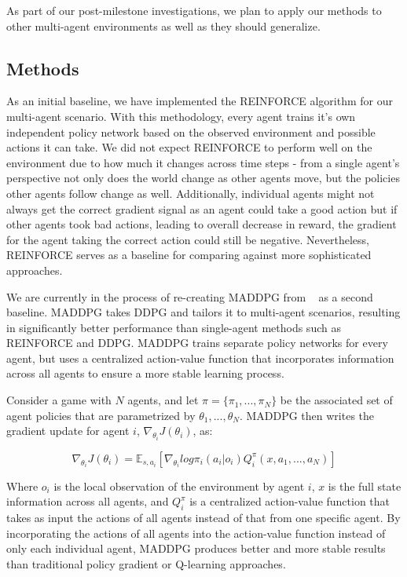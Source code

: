 \documentclass{article}
\begin{document}
As part of our post-milestone investigations, we plan to apply our methods to other multi-agent environments as well as they should generalize.

\subsection{Methods}
As an initial baseline, we have implemented the REINFORCE algorithm for our multi-agent scenario. With this methodology, every agent trains it's own independent policy network based on the observed environment and possible actions it can take. We did not expect REINFORCE to perform well on the environment due to how much it changes across time steps - from a single agent's perspective not only does the world change as other agents move, but the policies other agents follow change as well. Additionally, individual agents might not always get the correct gradient signal as an agent could take a good action but if other agents took bad actions, leading to overall decrease in reward, the gradient for the agent taking the correct action could still be negative. Nevertheless, REINFORCE serves as a baseline for comparing against more sophisticated approaches.

We are currently in the process of re-creating MADDPG from ~\cite{maddpg} as a second baseline. MADDPG takes DDPG and tailors it to multi-agent scenarios, resulting in significantly better performance than single-agent methods such as REINFORCE and DDPG. MADDPG trains separate policy networks for every agent, but uses a centralized action-value function that incorporates information across all agents to ensure a more stable learning process. 

Consider a game with $N$ agents, and let $\pi = \{\pi_1, ..., \pi_N\}$ be the associated set of agent policies that are parametrized by $\theta_1, ..., \theta_N$. MADDPG then writes the gradient update for agent $i$, $\nabla_{\theta_i} J(\theta_i)$, as:

$$\nabla_{\theta_i}J(\theta_i) = \mathbb{E}_{s, a_i}[\nabla_{\theta_i}log \pi_i(a_i|o_i)Q^{\pi}_i(x, a_1, ..., a_N)]$$

Where $o_i$ is the local observation of the environment by agent $i$, $x$ is the full state information across all agents, and $Q^{\pi}_i$ is a centralized action-value function that takes as input the actions of all agents instead of that from one specific agent. By incorporating the actions of all agents into the action-value function instead of only each individual agent, MADDPG produces better and more stable results than traditional policy gradient or Q-learning approaches.
\end{document}
